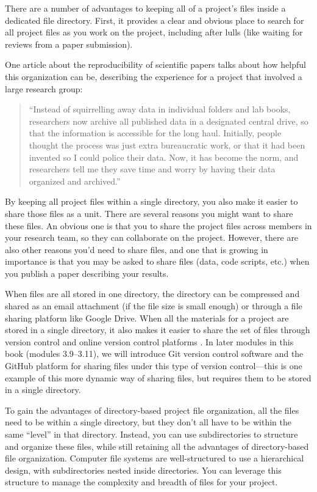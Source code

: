 \documentclass[]{tufte-book}
\begin{document}
There are a number of advantages to keeping all of a project's files inside a
dedicated file directory. First, it provides a clear and obvious place to search
for all project files as you work on the project, including after lulls (like
waiting for reviews from a paper submission).

One article about the reproducibility of scientific papers talks about how helpful
this organization can be, describing the experience for a project that involved
a large research group:

\begin{quote}
``Instead of squirrelling away data in individual folders and lab books,
researchers now archive all published data in a designated central drive, so
that the information is accessible for the long haul. Initially, people thought
the process was just extra bureaucratic work, or that it had been invented so I
could police their data. Now, it has become the norm, and researchers tell me
they save time and worry by having their data organized and archived.''
\citep{winchester2018give}
\end{quote}

By keeping all project files within a single directory, you also make it
easier to share those files as a unit. There are several reasons you might
want to share these files. An obvious one is that you to share
the project files across members in your research team, so they can collaborate
on the project. However, there are also other reasons you'd need to
share files, and one that is growing in importance is that you may be asked to
share files (data, code scripts, etc.) when you publish a paper describing your
results.

When files are all stored in one directory, the directory can be compressed and
shared as an email attachment (if the file size is small enough) or through a
file sharing platform like Google Drive. When all the materials for a project
are stored in a single directory, it also makes it easier to share the set of
files through version control and online version control platforms
\citep{vuorre2021sharing}. In later modules in this book (modules 3.9--3.11), we will
introduce Git version control software and the GitHub platform for sharing files
under this type of version control---this is one example of this more dynamic
way of sharing files, but requires them to be stored in a single directory.

To gain the advantages of directory-based project file organization, all the
files need to be within a single directory, but they don't all have to be within
the same ``level'' in that directory. Instead, you can use subdirectories to
structure and organize these files, while still retaining all the advantages of
directory-based file organization. Computer file systems are well-structured to
use a hierarchical design, with subdirectories nested inside directories. You
can leverage this structure to manage the complexity and breadth of files for your
project.
\end{document}
